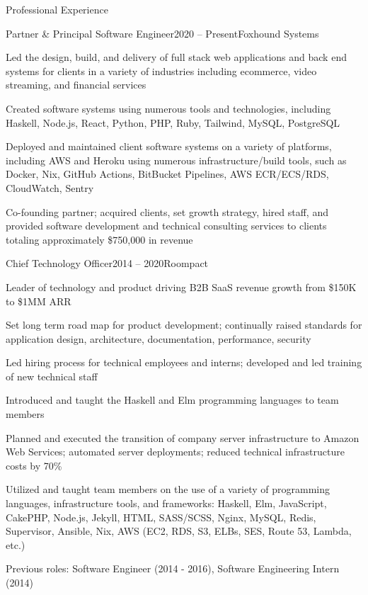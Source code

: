 \documentclass{resume} %
\begin{document}

\begin{rSection}{Professional Experience}

\begin{rSubsection}{Partner \& Principal Software Engineer}{2020 -- Present}{Foxhound Systems}{}
  \item Led the design, build, and delivery of full stack web applications and back end systems for clients in a variety of industries including ecommerce, video streaming, and financial services
  \item Created software systems using numerous tools and technologies, including Haskell, Node.js, React, Python, PHP, Ruby, Tailwind, MySQL, PostgreSQL
  \item Deployed and maintained client software systems on a variety of platforms, including AWS and Heroku using numerous infrastructure/build tools, such as Docker, Nix, GitHub Actions, BitBucket Pipelines, AWS ECR/ECS/RDS, CloudWatch, Sentry
  \item Co-founding partner; acquired clients, set growth strategy, hired staff, and provided software development and technical consulting services to clients totaling approximately \$750,000 in revenue
\end{rSubsection}


\begin{rSubsection}{Chief Technology Officer}{2014 -- 2020}{Roompact}{}
  \item Leader of technology and product driving B2B SaaS revenue growth from \$150K to \$1MM ARR
  \item Set long term road map for product development; continually raised standards for application design, architecture, documentation, performance, security
  \item Led hiring process for technical employees and interns; developed and led training of new technical staff
  \item Introduced and taught the Haskell and Elm programming languages to team members
  \item Planned and executed the transition of company server infrastructure to Amazon Web Services; automated server deployments; reduced technical infrastructure costs by 70\%
  \item Utilized and taught team members on the use of a variety of programming languages, infrastructure tools, and frameworks: Haskell, Elm, JavaScript, CakePHP, Node.js, Jekyll, HTML, SASS/SCSS, Nginx, MySQL, Redis, Supervisor, Ansible, Nix, AWS (EC2, RDS, S3, ELBs, SES, Route 53, Lambda, etc.)
  \item Previous roles: Software Engineer (2014 - 2016), Software Engineering Intern (2014)
\end{rSubsection}


\end{rSection}
\end{document}
